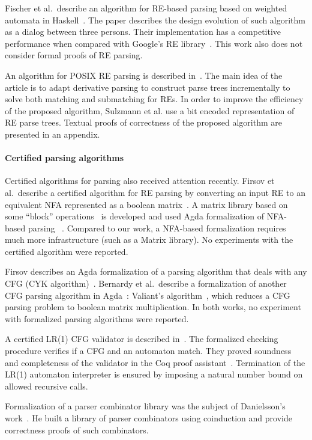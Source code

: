 \documentclass[fleqn,10pt]{SelfArx} %
\theoremstyle{definition}
\begin{document}
Fischer et al.~describe an algorithm for RE-based parsing based on
weighted automata in Haskell~\cite{Fischer2010}.  The paper describes
the design evolution of such algorithm as a dialog between three
persons. Their implementation has a competitive performance when
compared with Google's RE library~\cite{re2}. This work also does not
consider formal proofs of RE parsing.

An algorithm for POSIX RE parsing is described
in~\cite{SulzmannL14}. The main idea of the article is to adapt
derivative parsing to construct parse trees incrementally to solve
both matching and submatching for REs. In order to improve the
efficiency of the proposed algorithm, Sulzmann et al. use a bit
encoded representation of RE parse trees. Textual proofs of
correctness of the proposed algorithm are presented in an appendix.

\paragraph{Certified parsing algorithms} Certified algorithms for
parsing also received attention recently. Firsov et al.~describe a
certified algorithm for RE parsing by converting an input RE to an
equivalent NFA represented as a boolean matrix~\cite{FirsovU13}. A
matrix library based on some ``block'' operations~\cite{MacedoO13} is
developed and used Agda formalization of NFA-based parsing
~\cite{Norell2009}. Compared to our work, a NFA-based formalization requires
much more infrastructure (such as a Matrix library). No experiments
with the certified algorithm were reported.

Firsov describes an Agda formalization of a parsing algorithm that
deals with any CFG (CYK algorithm)~\cite{Firsov2014}. Bernardy
et al.~describe a formalization of another CFG parsing algorithm in
Agda~\cite{BernardyJ16}: Valiant's algorithm~\cite{Valiant1975}, which
reduces a CFG parsing problem to boolean matrix multiplication. In both works,
no experiment with formalized parsing algorithms were reported.

A certified LR(1) CFG validator is described
in~\cite{Jourdan2012}. The formalized checking procedure verifies if
a CFG and an automaton match. They proved soundness and completeness of
the validator in the Coq proof
assistant~\cite{Bertot2010}. Termination of the LR(1) automaton
interpreter is ensured by imposing a natural number bound on
allowed recursive calls.

Formalization of a parser combinator library was the subject of
Danielsson's work~\cite{Danielsson2010}. He built a library of parser
combinators using coinduction and provide correctness proofs of such
combinators.
\end{document}

